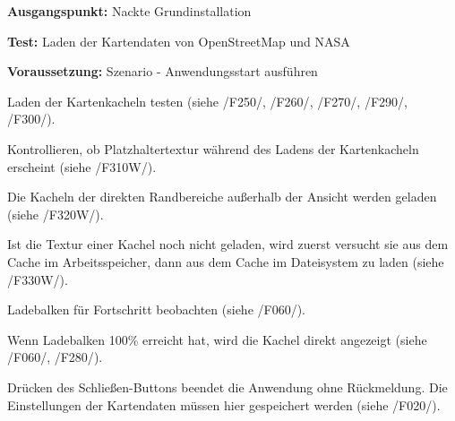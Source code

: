\documentclass[10pt]{scrreprt}
\newenvironment{details}[1][6pt]{%
  \parskip#1 \parindent6mm \raggedright%
  \def\item{\par\ignorespaces\hangindent=5mm \hangafter1}}{%
  \par\ignorespaces}
\newcommand{\sfbf}[1]{\textbf{\sffamily #1}}
\newcommand{\ziel}[1]{{\fontsize{9.5}{11}\textsf{/#1/}}}
\newcommand{\ziellabel}{Z}
\newcommand{\muss}{\renewcommand{\labelenumi}{\textbf{\ziel{\ziellabel\numprint{\theenumi}0}}}}
\newcommand{\wunsch}{\renewcommand{\labelenumi}{\textbf{\ziel{\ziellabel\numprint{\theenumi}0W}}}}
\begin{document}
\vspace{1.0cm}
\begin{details}[2pt]
\item \sfbf{Ausgangspunkt:} Nackte Grundinstallation \\
\item \sfbf{Test:} Laden der Kartendaten von OpenStreetMap und NASA \\
\item \sfbf{Voraussetzung:} Szenario - Anwendungsstart ausführen
\end{details}
\vspace{2mm}
\begin{enumerate}[leftmargin = 2.2cm, resume]
\item Laden der Kartenkacheln testen (siehe \ziel{F250}, \ziel{F260}, \ziel{F270}, \ziel{F290}, \ziel{F300}).
\wunsch
\item Kontrollieren, ob Platzhaltertextur während des Ladens der Kartenkacheln erscheint (siehe \ziel{F310W}).
\item Die Kacheln der direkten Randbereiche außerhalb der Ansicht werden geladen (siehe \ziel{F320W}).
\item Ist die Textur einer Kachel noch nicht geladen, wird zuerst versucht sie aus dem Cache im Arbeitsspeicher, dann aus dem Cache im Dateisystem zu laden (siehe \ziel{F330W}).
\muss
\item Ladebalken für Fortschritt beobachten (siehe \ziel{F060}).
\item Wenn Ladebalken 100\% erreicht hat, wird die Kachel direkt angezeigt (siehe \ziel{F060}, \ziel{F280}).
\item Drücken des Schließen-Buttons beendet die Anwendung ohne Rückmeldung. Die Einstellungen der Kartendaten müssen hier gespeichert werden (siehe \ziel{F020}).
\end{enumerate}
\end{document}

